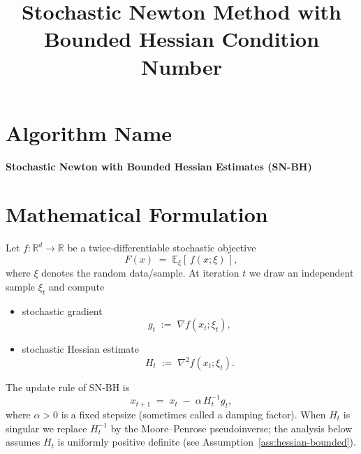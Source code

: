\documentclass{article}
\title{Stochastic Newton Method with Bounded Hessian Condition Number}
\author{ }
\date{ }
\begin{document}
\maketitle

\tableofcontents

\newpage

\section*{Algorithm Name}
\begin{center}
\textbf{Stochastic Newton with Bounded Hessian Estimates (SN-BH)}
\end{center}

\section*{Mathematical Formulation}
Let $f:\mathbb{R}^d\rightarrow\mathbb{R}$ be a twice‑differentiable stochastic objective
\[
    F(x)\;=\;\mathbb{E}_{\xi}[\,f(x;\xi)\,],
\]
where $\xi$ denotes the random data/sample.  
At iteration $t$ we draw an independent sample $\xi_t$ and compute

\begin{itemize}
    \item stochastic gradient 
    \[
        g_t \;:=\; \nabla f(x_t;\xi_t),
    \]
    \item stochastic Hessian estimate 
    \[
        H_t \;:=\; \nabla^2 f(x_t;\xi_t).
    \]
\end{itemize}
The update rule of SN‑BH is
\begin{equation}
    \boxed{\;
        x_{t+1}\;=\;x_t\;-\;\alpha\, H_t^{-1} g_t,
    \;}
    \label{eq:update}
\end{equation}
where $\alpha>0$ is a fixed stepsize (sometimes called a damping factor).  
When $H_t$ is singular we replace $H_t^{-1}$ by the Moore–Penrose pseudoinverse; the analysis below assumes $H_t$ is uniformly positive definite (see Assumption~\ref{ass:hessian-bounded}).

\end{document}

